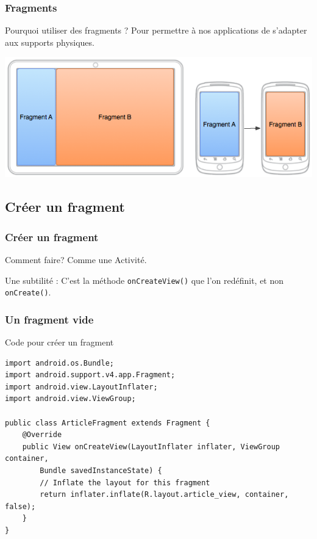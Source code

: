 \documentclass{beamer}
\begin{document}
\begin{frame}
\frametitle{Fragments}

\begin{block}{Pourquoi utiliser des fragments ?}
Pour permettre à nos applications de s'adapter aux supports physiques.
\end{block}

\begin{center}
\includegraphics[scale=0.5]{fragments-screen-mock.png}
\end{center}
\end{frame}

\subsection{Créer un fragment}

\begin{frame}
\frametitle{Créer un fragment}
\begin{block}{Comment faire?}
Comme une Activité.
\end{block}

\begin{block}{Une subtilité :}
C'est la méthode \verb!onCreateView()! que l'on redéfinit, et non \verb!onCreate()!.
\end{block}
\end{frame}


\begin{frame}[fragile]
\frametitle{Un fragment vide}
\begin{block}{Code pour créer un fragment}
\lstset{language=java}
\begin{lstlisting}
import android.os.Bundle;
import android.support.v4.app.Fragment;
import android.view.LayoutInflater;
import android.view.ViewGroup;

public class ArticleFragment extends Fragment {
    @Override
    public View onCreateView(LayoutInflater inflater, ViewGroup container,
        Bundle savedInstanceState) {
        // Inflate the layout for this fragment
        return inflater.inflate(R.layout.article_view, container, false);
    }
}
\end{lstlisting}
\end{block}
\end{frame}
\end{document}
